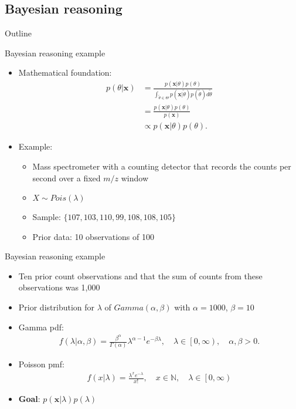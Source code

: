 \documentclass[xcolor=dvipsnames]{beamer}
\begin{document}
\subsection{Bayesian reasoning}
\begin{frame}{Outline}
	\vspace{-10.5pt}
	\tableofcontents[currentsection,subsectionstyle=show/shaded/hide]
\end{frame}

\begin{frame}{Bayesian reasoning example}
\vspace{-15pt}
\begin{itemize}
	\item Mathematical foundation:
	\begin{align*}
	p(\theta|\textbf{x})&=\frac{p(\textbf{x}|\theta)p(\theta)}{\int_{\tilde{\theta} \in \Theta} p(\textbf{x}|\tilde{\theta})p(\tilde{\theta})d\tilde{\theta}}\\ &=\frac{p(\textbf{x}|\theta)p(\theta)}{p(\textbf{x})}\\
	&\propto p(\textbf{x}|\theta)p(\theta).
	\end{align*}
	\item Example:
	\begin{itemize}
		\item Mass spectrometer with a counting detector that records the counts per second over a fixed $m/z$ window
		\item $X\sim Pois(\lambda)$
		\item Sample: $\{107, 103, 110, 99, 108, 108, 105\}$
		\item Prior data: 10 observations of 100
	\end{itemize}
\end{itemize}
\end{frame}

\begin{frame}{Bayesian reasoning example}
	\vspace{-15pt}
	\begin{itemize}
		\item Ten prior count observations and that the sum of counts from these observations was 1,000
		\item Prior distribution for $\lambda$ of $Gamma(\alpha, \beta)$ with $\alpha=1000$, $\beta=10$
		\item Gamma pdf:
		\begin{gather*}
		f(\lambda|\alpha,\beta) =\frac{\beta^{\alpha}}{\Gamma(\alpha)}\lambda^{\alpha-1}e^{-\beta \lambda}, \quad \lambda \in \left[0, \infty \right), \quad \alpha,\beta >0.
		\end{gather*}
		\item Poisson pmf:
		\begin{gather*}
			f(x|\lambda)=\frac{\lambda^x e^{-\lambda}}{x!}, \quad x \in \mathbb{N}, \quad \lambda \in \left[0, \infty \right)
		\end{gather*}
		\item \textbf{Goal}:  $p(\textbf{x}|\lambda)p(\lambda)$
	\end{itemize}
\end{frame}
\end{document}
